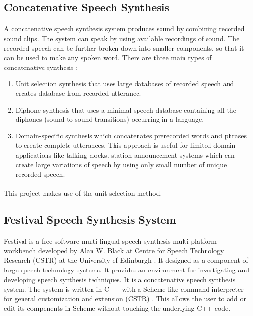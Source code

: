 \documentclass{article}
\begin{document}
		\subsection{Concatenative Speech Synthesis}
			\paragraph{}
				A concatenative speech synthesis system produces sound by combining recorded sound clips. The system can speak by using available recordings of sound. The recorded speech can be further broken down into smaller components, so that it can be used to make any spoken word. There are three main types of concatenative synthesis \cite{HINDITTS:5}:
				\begin{enumerate}
					\item Unit selection synthesis that uses large databases of recorded speech and creates database from recorded utterance.
					\item Diphone synthesis that uses a minimal speech database containing all the diphones (sound-to-sound transitions) occurring in a language.
					\item Domain-specific synthesis which concatenates prerecorded words and phrases to create complete utterances. This approach is useful for limited domain applications like talking clocks, station announcement systems which can create large variations of speech by using only small number of unique recorded speech. 
				\end{enumerate}
		
		\paragraph{}
			This project makes use of the unit selection method.
	
		\subsection{Festival Speech Synthesis System}
			\paragraph{}
				Festival is a free software multi-lingual speech synthesis multi-platform workbench developed by Alan W. Black at Centre for Speech Technology Research (CSTR) at the University of Edinburgh \cite{FESTIVAL:2}. It designed as a component of large speech technology systems. It provides an environment for investigating  and developing speech synthesis techniques. It is a concatenative speech synthesis system. The system is written in C++ with a Scheme-like command interpreter for general customization and extension (CSTR) \cite{FESTIVAL:2}. This allows the user to add or edit its components in Scheme without touching the underlying C++ code.
	
\end{document}
